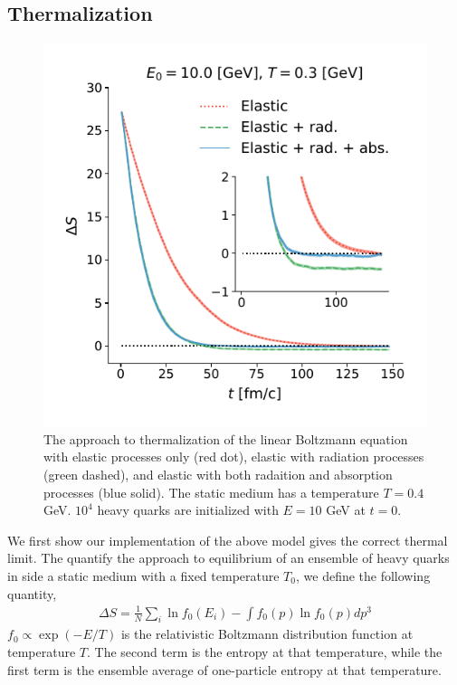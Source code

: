 \documentclass[aps, prc, reprint, amsmath, groupedaddress, nofootinbib]{revtex4-1}
\begin{document}
\subsection{Thermalization}
\begin{figure}
\includegraphics[width=\columnwidth]{charm-plot/thermalization.pdf}
\caption{The approach to thermalization of the linear Boltzmann equation with elastic processes only (red dot), elastic with radiation processes (green dashed), and elastic with both radaition and absorption processes (blue solid). The static medium has a temperature $T = 0.4$ GeV. $10^4$ heavy quarks are initialized with $E = 10$ GeV at $t = 0$.}\label{plots:thermalization}
\end{figure}
We first show our implementation of the above model gives the correct thermal limit. 
The quantify the approach to equilibrium of an ensemble of heavy quarks in side a static medium with a fixed temperature $T_0$, we define the following quantity,
\begin{eqnarray}
\Delta S = \frac{1}{N}\sum_i \ln f_0(E_i) - \int f_0(p)\ln f_0(p) dp^3
\end{eqnarray}
$f_0 \propto \exp(-E/T)$ is the relativistic Boltzmann distribution function at temperature $T$. 
The second term is the entropy at that temperature, while the first term is the ensemble average of one-particle entropy at that temperature.
\end{document}
